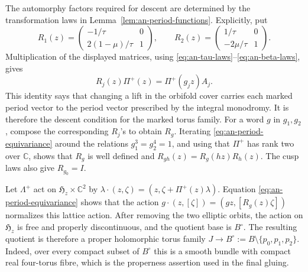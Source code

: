 \documentclass[11pt]{article}
\theoremstyle{definition}
\theoremstyle{remark}
\numberwithin{equation}{section}
\newcommand{\CC}{\mathbb C}
\begin{document}
The automorphy factors required for descent are determined by the
transformation laws in Lemma~\ref{lem:an-period-functions}.  Explicitly, put
\begin{equation*}
 R_1(z)=
 \begin{pmatrix}
 -1/\tau&0\\2(1-\mu)/\tau&1
 \end{pmatrix},
 \qquad
 R_2(z)=
 \begin{pmatrix}
 1/\tau&0\\-2\mu/\tau&1
 \end{pmatrix}.
\end{equation*}
Multiplication of the displayed matrices, using
\eqref{eq:an-tau-laws}--\eqref{eq:an-beta-laws}, gives
\begin{equation}\label{eq:an-period-equivariance}
 R_j(z)\Pi^+(z)=\Pi^+(g_jz)A_j.
\end{equation}
This identity says that changing a lift in the orbifold cover carries each
marked period vector to the period vector prescribed by the integral
monodromy.  It is therefore the descent condition for the marked torus
family.
For a word $g$ in $g_1,g_2$, compose the corresponding $R_j$'s to
obtain $R_g$.  Iterating \eqref{eq:an-period-equivariance} around the
relations $g_1^3=g_2^4=1$, and using that $\Pi^+$ has rank two over
$\mathbb C$, shows that $R_g$ is well defined and
$R_{gh}(z)=R_g(hz)R_h(z)$.  The cusp laws also give $R_{g_0}=I$.

Let $\Lambda^+$ act on $\mathfrak H_z\times\CC^2$ by
$\lambda\cdot(z,\zeta)=(z,\zeta+\Pi^+(z)\lambda)$.
Equation \eqref{eq:an-period-equivariance} shows that the action
$g\cdot(z,[\zeta])=(gz,[R_g(z)\zeta])$
normalizes this lattice action.  After removing the two elliptic orbits, the
action on $\mathfrak H_z$ is free and properly discontinuous, and the
quotient base is $B^\circ$.  The resulting quotient is therefore a proper
holomorphic torus family
$J\to B^\circ:=B\setminus\{p_0,p_1,p_2\}$.
Indeed, over every compact subset of $B^\circ$ this is a smooth bundle
with compact real four-torus fibre, which is the properness assertion used
in the final gluing.
\end{document}
